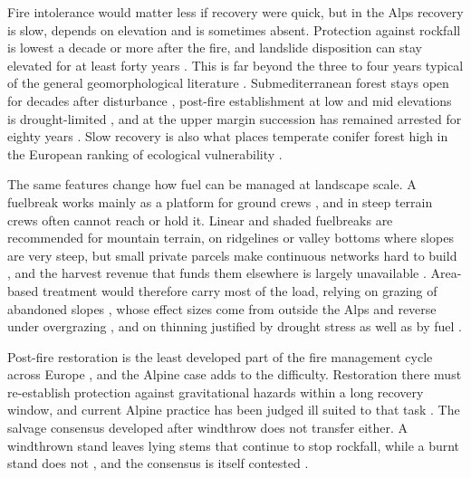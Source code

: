\documentclass[11pt,a4paper]{article}
\begin{document}
Fire intolerance would matter less if recovery were quick, but in the Alps recovery is slow, depends on elevation and is sometimes absent. Protection against rockfall is lowest a decade or more after the fire, and landslide disposition can stay elevated for at least forty years \citep{maringer_temporal_2016, gehring_shallow_2019}. This is far beyond the three to four years typical of the general geomorphological literature \citep{santi_wildfire_2022}. Submediterranean forest stays open for decades after disturbance \citep{stritih_alternative_2023}, post-fire establishment at low and mid elevations is drought-limited \citep{moser_potential_2010}, and at the upper margin succession has remained arrested for eighty years \citep{degiuli_arrested_2024}. Slow recovery is also what places temperate conifer forest high in the European ranking of ecological vulnerability \citep{arrogantefunes_mapping_2024}.

The same features change how fuel can be managed at landscape scale. A fuelbreak works mainly as a platform for ground crews \citep{ortega_modeling_2024}, and in steep terrain crews often cannot reach or hold it. Linear and shaded fuelbreaks are recommended for mountain terrain, on ridgelines or valley bottoms where slopes are very steep, but small private parcels make continuous networks hard to build \citep{ascoli_firebreak_2018, gorrizmifsud_current_2026}, and the harvest revenue that funds them elsewhere is largely unavailable \citep{dinca_timber_2025}. Area-based treatment would therefore carry most of the load, relying on grazing of abandoned slopes \citep{rouetleduc_effects_2021}, whose effect sizes come from outside the Alps and reverse under overgrazing \citep{xu_how_2026}, and on thinning justified by drought stress as well as by fuel \citep{giuggiola_droughtinduced_2010}.

Post-fire restoration is the least developed part of the fire management cycle across Europe \citep{vieira_postfire_2026}, and the Alpine case adds to the difficulty. Restoration there must re-establish protection against gravitational hazards within a long recovery window, and current Alpine practice has been judged ill suited to that task \citep{mantero_short-term_2023}. The salvage consensus developed after windthrow does not transfer either. A windthrown stand leaves lying stems that continue to stop rockfall, while a burnt stand does not \citep{costa_biological_2021, asteriou_assessing_2025}, and the consensus is itself contested \citep{seben_impact_2024}.
\end{document}
